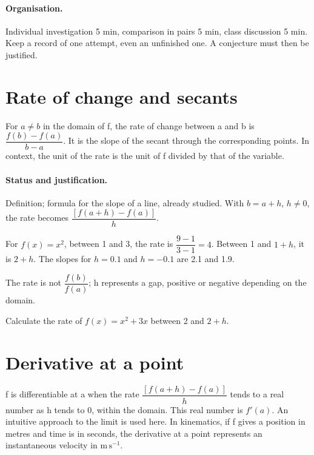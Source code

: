 \paragraph{Organisation.} Individual investigation 5 min, comparison in pairs 5 min, class discussion 5 min. Keep a record of one attempt, even an unfinished one. A conjecture must then be justified.
\mxnewpage
\section{Rate of change and secants}\label{C04-U1}
\begin{keypoint}
For $a\ne b$ in the domain of f, the rate of change between a and b is $\dfrac{f(b)-f(a)}{b-a}$. It is the slope of the secant through the corresponding points. In context, the unit of the rate is the unit of f divided by that of the variable.
\end{keypoint}
\paragraph{Status and justification.} Definition; formula for the slope of a line, already studied. With $b=a+h$, $h\ne0$, the rate becomes $\dfrac{[f(a+h)-f(a)]}{h}$.
\begin{example}For $f(x)=x^2$, between 1 and 3, the rate is $\dfrac{9-1}{3-1}=4$. Between 1 and $1+h$, it is $2+h$. The slopes for $h=\num{0,1}$ and $h=-\num{0,1}$ are \num{2,1} and \num{1,9}.\end{example}\label{C04-EX1}
\begin{pitfall}The rate is not $\dfrac{f(b)}{f(a)}$; h represents a gap, positive or negative depending on the domain.\end{pitfall}
\begin{application}Calculate the rate of $f(x)=x^2+3x$ between 2 and $2+h$.\end{application}\label{C04-AP1}
\section{Derivative at a point}\label{C04-U2}
\begin{keypoint}
f is differentiable at a when the rate $\dfrac{[f(a+h)-f(a)]}{h}$ tends to a real number as h tends to 0, within the domain. This real number is $f\prime(a)$. An intuitive approach to the limit is used here. In kinematics, if f gives a position in metres and time is in seconds, the derivative at a point represents an instantaneous velocity in $\mathrm{m\,s^{-1}}$.
\end{keypoint}
